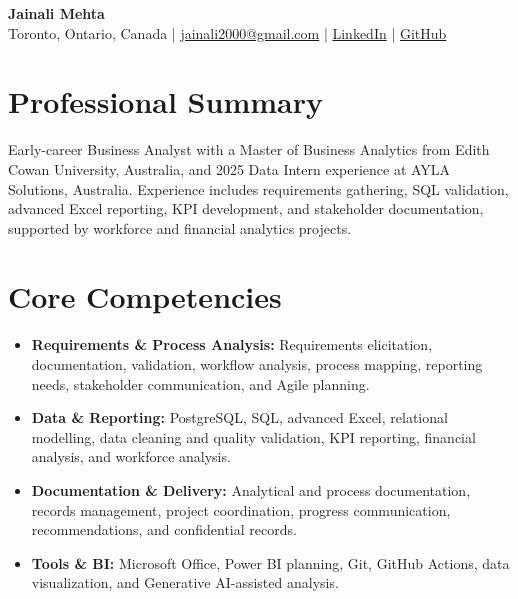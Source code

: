 \documentclass[letterpaper,10pt]{article}
\begin{document}
\begin{center}
  {\fontsize{17}{19}\selectfont\textbf{Jainali Mehta}}\\[2pt]
  \small Toronto, Ontario, Canada \;|\;
  \href{mailto:jainali2000@gmail.com}{jainali2000@gmail.com} \;|\;
  \href{https://www.linkedin.com/in/jainali-mehta}{LinkedIn} \;|\;
  \href{https://github.com/jainalimehta}{GitHub}
\end{center}
\vspace{-7pt}

\section{Professional Summary}
\small Early-career Business Analyst with a Master of Business Analytics from Edith Cowan University, Australia, and 2025 Data Intern experience at AYLA Solutions, Australia. Experience includes requirements gathering, SQL validation, advanced Excel reporting, KPI development, and stakeholder documentation, supported by workforce and financial analytics projects.

\section{Core Competencies}
\begin{itemize}[leftmargin=0.16in,label=\textbullet,topsep=0pt,itemsep=1pt,parsep=0pt]
  \item \small \textbf{Requirements \& Process Analysis:} Requirements elicitation, documentation, validation, workflow analysis, process mapping, reporting needs, stakeholder communication, and Agile planning.
  \item \small \textbf{Data \& Reporting:} PostgreSQL, SQL, advanced Excel, relational modelling, data cleaning and quality validation, KPI reporting, financial analysis, and workforce analysis.
  \item \small \textbf{Documentation \& Delivery:} Analytical and process documentation, records management, project coordination, progress communication, recommendations, and confidential records.
  \item \small \textbf{Tools \& BI:} Microsoft Office, Power BI planning, Git, GitHub Actions, data visualization, and Generative AI-assisted analysis.
\end{itemize}
\end{document}
